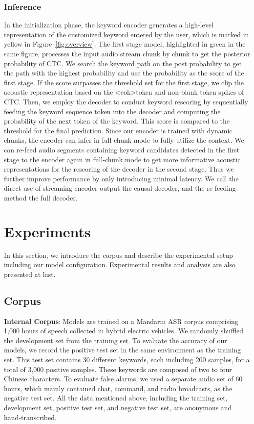 \documentclass{article}
\begin{document}
\subsubsection{Inference}
\label{sec:infer}
In the initialization phase, the keyword encoder generates a high-level representation of the customized keyword entered by the user, which is marked in yellow in Figure~\ref{fig:overview}. The first stage model, highlighted in green in the same figure, processes the input audio stream chunk by chunk to get the posterior probability of CTC. We search the keyword path on the post probability to get the path with the highest probability and use the probability as the score of the first stage. If the score surpasses the threshold set for the first stage, we clip the acoustic representation based on the \textless eok\textgreater\enspace token and non-blank token spikes of CTC. Then, we employ the decoder to conduct keyword rescoring by sequentially feeding the keyword sequence token into the decoder and computing the probability of the next token of the keyword. This score is compared to the threshold for the final prediction. Since our encoder is trained with dynamic chunks, the encoder can infer in full-chunk mode to fully utilize the context. We can re-feed audio segments containing keyword candidates detected in the first stage to the encoder again in full-chunk mode to get more informative acoustic representations for the rescoring of the decoder in the second stage. Thus we further improve performance by only introducing minimal latency. We call the direct use of streaming encoder output the causal decoder, and the re-feeding method the full decoder.


\vspace{-8pt}
\section{Experiments}
\label{sec:exp}
In this section, we introduce the corpus and describe the experimental setup including our model configuration. Experimental results and analysis are also presented at last.
\subsection{Corpus}
\textbf{Internal Corpus}:  Models are trained on a Mandarin ASR corpus comprising 1,000 hours of speech collected in hybrid electric vehicles. We randomly shuffled the development set from the training set.
To evaluate the accuracy of our models, we record the positive test set in the same environment as the training set. This test set contains 30 different keywords, each including 200 samples, for a total of 3,000 positive samples. These keywords are composed of two to four Chinese characters.
To evaluate false alarms, we used a separate audio set of 60 hours, which mainly contained chat, command, and radio broadcasts, as the negative test set.
All the data mentioned above, including the training set, development set, positive test set, and negative test set, are anonymous and hand-transcribed.
\end{document}
